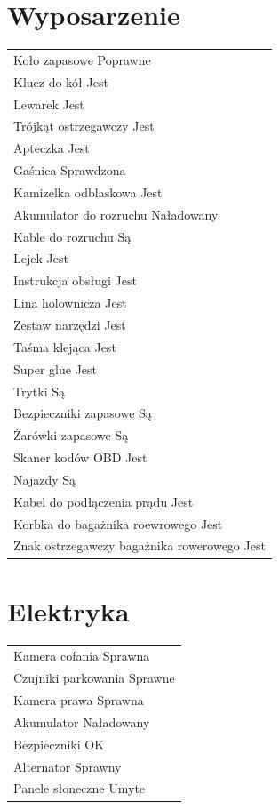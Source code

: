 \documentclass{article}
\begin{document}
\begin{multicols}{2}
\section{Wyposarzenie}
\begin{tabularx}{\columnwidth}{|X|}
\hline
Koło zapasowe \dotfill Poprawne \\
Klucz do kół \dotfill Jest \\
Lewarek \dotfill Jest \\
Trójkąt ostrzegawczy \dotfill Jest \\
Apteczka \dotfill Jest \\
Gaśnica \dotfill Sprawdzona \\
Kamizelka odblaskowa \dotfill Jest \\
Akumulator do rozruchu \dotfill Naładowany \\
Kable do rozruchu \dotfill Są \\
Lejek \dotfill Jest \\
Instrukcja obsługi \dotfill Jest \\
Lina holownicza \dotfill Jest \\
Zestaw narzędzi \dotfill Jest \\
Taśma klejąca \dotfill Jest \\
Super glue \dotfill Jest \\
Trytki \dotfill Są \\
Bezpieczniki zapasowe \dotfill Są \\
Żarówki zapasowe \dotfill Są \\
Skaner kodów OBD \dotfill Jest \\
Najazdy \dotfill Są \\
Kabel do podłączenia prądu \dotfill Jest \\
Korbka do bagażnika roewrowego \dotfill Jest \\
Znak ostrzegawczy bagażnika rowerowego \dotfill Jest \\
\hline
\end{tabularx}

\section{Elektryka}
\begin{tabularx}{\columnwidth}{|X|}
\hline
Kamera cofania \dotfill Sprawna \\
Czujniki parkowania \dotfill Sprawne \\
Kamera prawa \dotfill Sprawna \\
Akumulator \dotfill Naładowany \\
Bezpieczniki \dotfill OK \\
Alternator \dotfill Sprawny \\
Panele słoneczne \dotfill Umyte \\
\hline
\end{tabularx}


\end{multicols}
\end{document}
